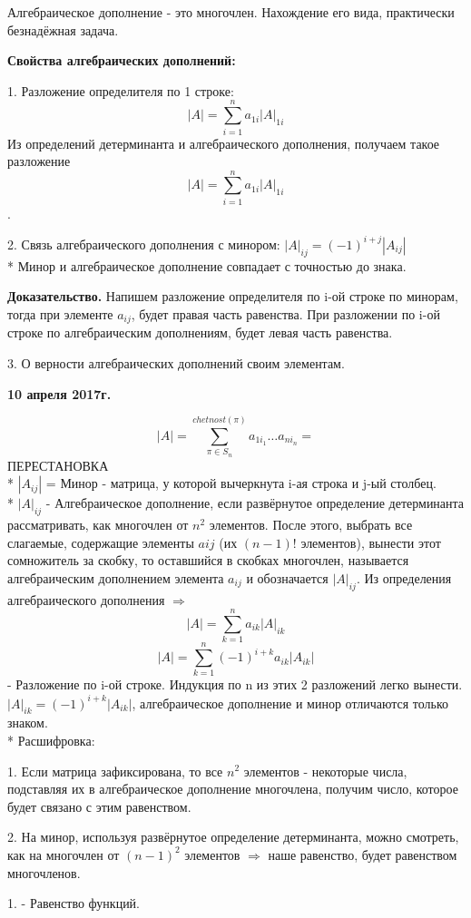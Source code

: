 \documentclass{article}
\begin{document}
Алгебраическое дополнение - это многочлен. Нахождение его вида, практически безнадёжная задача.

{\bf Свойства алгебраических дополнений:}

1. Разложение определителя по 1 строке: $$|A|=\sum_{i=1}^n a_{1i}|A|_{1i}$$
Из определений детерминанта и алгебраического дополнения, получаем такое разложение $$|A|=\sum_{i=1}^n a_{1i}|A|_{1i}$$.

2. Связь алгебраического дополнения с минором: $|A|_{ij}=(-1)^{i+j}|A_{ij}|$\\*
Минор и алгебраическое дополнение совпадает с точностью до знака.

{\bf Доказательство.} Напишем разложение определителя по i-ой строке по минорам, тогда при элементе $a_{ij}$, будет правая часть равенства. При разложении по i-ой строке по алгебраическим дополнениям, будет левая часть равенства.

3. О верности алгебраических дополнений своим элементам.

\textbf {10 апреля 2017г.}

$$|A|=\sum_{\pi\in S_n}^{chetnost(\pi)} a_{1i_1}\ldots a_{ni_n}=$$ ПЕРЕСТАНОВКА\\*
$|A_{ij}|$ = Минор - матрица, у которой вычеркнута i-ая строка и j-ый столбец.\\*
$|A|_{ij}$ - Алгебраическое дополнение, если развёрнутое определение детерминанта рассматривать, как многочлен от $n^2$ элементов. После этого, выбрать все слагаемые, содержащие элементы $a{ij}$ (их $(n-1)!$ элементов), вынести этот сомножитель за скобку, то оставшийся в скобках многочлен, называется алгебраическим дополнением элемента $a_{ij}$ и обозначается $|A|_{ij}$. Из определения алгебраического дополнения $\Rightarrow$ $$|A|=\sum_{k=1}^n a_{ik}|A|_{ik}$$ 
$$|A|=\sum_{k=1}^n (-1)^{i+k}a_{ik}|A_{ik}|$$- Разложение по i-ой строке.
Индукция по n из этих 2 разложений легко вынести. $|A|_{ik}=(-1)^{i+k}|A_{ik}|$, алгебраическое дополнение и минор отличаются только знаком.\\*
Расшифровка:

1. Если матрица зафиксирована, то все $n^2$ элементов - некоторые числа, подставляя их в алгебраическое дополнение многочлена, получим число, которое будет связано с этим равенством.

2. На минор, используя развёрнутое определение детерминанта, можно смотреть, как на многочлен от $(n-1)^2$ элементов $\Rightarrow$ наше равенство, будет равенством многочленов.

1. - Равенство функций.
\end{document}

